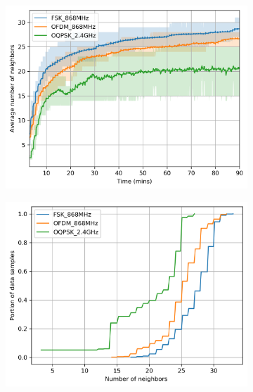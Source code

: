 \documentclass[journal]{IEEEtran}
\begin{document}
\begin{figure}[ht!]
	\centering
	\begin{subfigure}{0.6\columnwidth}
	\centering
	\includegraphics[width=1\columnwidth]{avg_numNeighbors_plot}
    \label{fig:neighbors_time}
	\end{subfigure}
	\begin{subfigure}{0.6\columnwidth}
		\centering
    	\includegraphics[width=01\columnwidth]{numNeighbors_cdf_plot_full_steady}
        \label{fig:neighbors_cdf}
	\end{subfigure}%

\end{figure}
\end{document}
